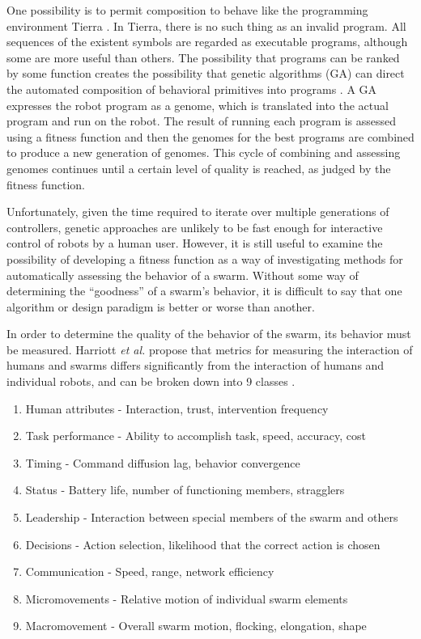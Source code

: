 One possibility is to permit composition to behave like the programming environment Tierra \citep{ray1991approach}.
In Tierra, there is no such thing as an invalid program. 
All sequences of the existent symbols are regarded as executable programs, although some are more useful than others. 
The possibility that programs can be ranked by some function creates the possibility that genetic algorithms (GA) can direct the automated composition of behavioral primitives into programs \citep{palmer2005emergence}.
A GA expresses the robot program as a genome, which is translated into the actual program and run on the robot. 
The result of running each program is assessed using a fitness function and then the genomes for the best programs are combined to produce a new generation of genomes. 
This cycle of combining and assessing genomes continues until a certain level of quality is reached, as judged by the fitness function.

Unfortunately, given the time required to iterate over multiple generations of controllers, genetic approaches are unlikely to be fast enough for interactive control of robots by a human user. 
However, it is still useful to examine the possibility of developing a fitness function as a way of investigating methods for automatically assessing the behavior of a swarm.
Without some way of determining the ``goodness'' of a swarm's behavior, it is difficult to say that one algorithm or design paradigm is better or worse than another. 

In order to determine the quality of the behavior of the swarm, its behavior must be measured.
Harriott \emph{et al.} propose that metrics for measuring the interaction of humans and swarms differs significantly from the interaction of humans and individual robots, and can be broken down into 9 classes \citep{harriott2014biologically}. 
\begin{enumerate}[noitemsep]
\item Human attributes - Interaction, trust, intervention frequency 
\item Task performance - Ability to accomplish task, speed, accuracy, cost
\item Timing - Command diffusion lag, behavior convergence
\item Status - Battery life, number of functioning members, stragglers
\item Leadership - Interaction between special members of the swarm and others
\item Decisions - Action selection, likelihood that the correct action is chosen
\item Communication - Speed, range, network efficiency
\item Micromovements - Relative motion of individual swarm elements
\item Macromovement - Overall swarm motion, flocking, elongation, shape 
\end{enumerate}


